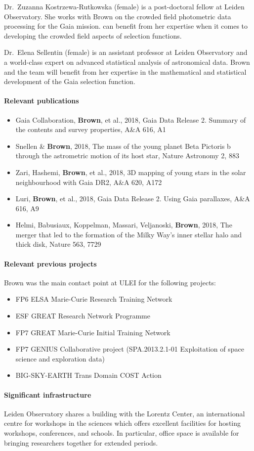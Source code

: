 Dr.~Zuzanna Kostrzewa-Rutkowska (female) is a post-doctoral fellow at Leiden Observatory. She works with Brown on the crowded field photometric data processing for the Gaia mission. {\acro} can benefit from her expertise when it comes to developing the crowded field aspects of selection functions.

Dr.~Elena Sellentin (female) is an assistant professor at Leiden Observatory and a world-class expert on advanced statistical analysis of astronomical data. Brown and the {\acro} team will benefit from her expertise in the mathematical and statistical development of the Gaia selection function.

\paragraph{Relevant publications}
\begin{itemize}
    \item Gaia Collaboration, \textbf{Brown}, et al., 2018, Gaia Data Release 2. Summary of the contents and survey properties, A\&A 616, A1 
    \item Snellen \& \textbf{Brown}, 2018, The mass of the young planet Beta Pictoris b through the astrometric motion of its host star, Nature Astronomy 2, 883 
    \item Zari, Hashemi, \textbf{Brown}, et al., 2018, 3D mapping of young stars in the solar neighbourhood with Gaia DR2, A\&A 620, A172 
    \item  Luri, \textbf{Brown}, et al., 2018, Gaia Data Release 2. Using Gaia parallaxes, A\&A 616, A9 
    \item Helmi, Babusiaux, Koppelman, Massari, Veljanoski, \textbf{Brown}, 2018, The merger that led to the formation of the Milky Way's inner stellar halo and thick disk, Nature 563, 7729 
\end{itemize}

\paragraph{Relevant previous projects}
Brown was the main contact point at ULEI for the following projects:
\begin{itemize}
    \item FP6 ELSA Marie-Curie Research Training Network
    \item ESF GREAT Research Network Programme 
    \item FP7 GREAT Marie-Curie Initial Training Network
    \item FP7 GENIUS Collaborative project (SPA.2013.2.1-01 Exploitation of space science and exploration data)
    \item BIG-SKY-EARTH Trans Domain COST Action
\end{itemize}

\paragraph{Significant infrastructure}
Leiden Observatory shares a building with the Lorentz Center, an international centre for workshops in the sciences which offers excellent facilities for hosting workshops, conferences, and schools. In particular, office space is available for bringing researchers together for extended periods.